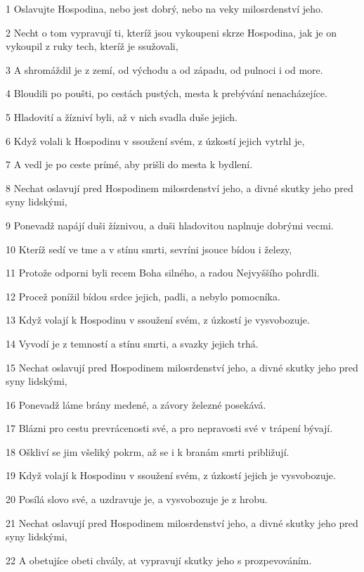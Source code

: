 \par 1 Oslavujte Hospodina, nebo jest dobrý, nebo na veky milosrdenství jeho.
\par 2 Necht o tom vypravují ti, kteríž jsou vykoupeni skrze Hospodina, jak je on vykoupil z ruky tech, kteríž je ssužovali,
\par 3 A shromáždil je z zemí, od východu a od západu, od pulnoci i od more.
\par 4 Bloudili po poušti, po cestách pustých, mesta k prebývání nenacházejíce.
\par 5 Hladovití a žízniví byli, až v nich svadla duše jejich.
\par 6 Když volali k Hospodinu v ssoužení svém, z úzkostí jejich vytrhl je,
\par 7 A vedl je po ceste prímé, aby prišli do mesta k bydlení.
\par 8 Nechat oslavují pred Hospodinem milosrdenství jeho, a divné skutky jeho pred syny lidskými,
\par 9 Ponevadž napájí duši žíznivou, a duši hladovitou naplnuje dobrými vecmi.
\par 10 Kteríž sedí ve tme a v stínu smrti, sevríni jsouce bídou i železy,
\par 11 Protože odporni byli recem Boha silného, a radou Nejvyššího pohrdli.
\par 12 Procež ponížil bídou srdce jejich, padli, a nebylo pomocníka.
\par 13 Když volají k Hospodinu v ssoužení svém, z úzkostí je vysvobozuje.
\par 14 Vyvodí je z temností a stínu smrti, a svazky jejich trhá.
\par 15 Nechat oslavují pred Hospodinem milosrdenství jeho, a divné skutky jeho pred syny lidskými,
\par 16 Ponevadž láme brány medené, a závory železné posekává.
\par 17 Blázni pro cestu prevrácenosti své, a pro nepravosti své v trápení bývají.
\par 18 Oškliví se jim všeliký pokrm, až se i k branám smrti približují.
\par 19 Když volají k Hospodinu v ssoužení svém, z úzkostí jejich je vysvobozuje.
\par 20 Posílá slovo své, a uzdravuje je, a vysvobozuje je z hrobu.
\par 21 Nechat oslavují pred Hospodinem milosrdenství jeho, a divné skutky jeho pred syny lidskými,
\par 22 A obetujíce obeti chvály, at vypravují skutky jeho s prozpevováním.
